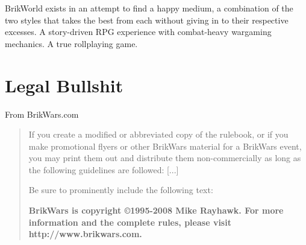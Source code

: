 \documentclass[12pt,a4paper,twocolumn]{article}
\begin{document}
BrikWorld exists in an attempt to find a happy medium, a combination of the two styles that takes the best from each without giving in to their respective excesses.  A story-driven RPG experience with combat-heavy wargaming mechanics.  A true rollplaying game.

\section {Legal Bullshit}
From BrikWars.com
\begin{quotation}
If you create a modified or abbreviated copy of the rulebook, or if you make promotional flyers or other BrikWars material for a BrikWars event, you may print them out and distribute them non-commercially as long as the following guidelines are followed: [...]

Be sure to prominently include the following text:

\begin{center}{\bf
BrikWars is copyright ©1995-2008 Mike Rayhawk.
For more information and the complete rules, please visit http://www.brikwars.com.}
\end{center}
\end{quotation}
\end{document}
